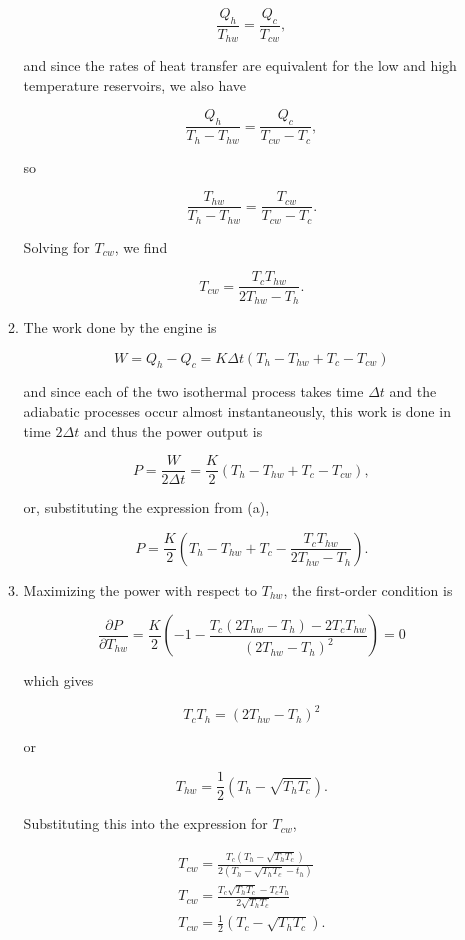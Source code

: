 \documentclass{article}
\begin{document}
\begin{enumerate}
\begin{enumerate}
		$$\frac{Q_h}{T_{hw}} = \frac{Q_c}{T_{cw}},$$

		and since the rates of heat transfer are equivalent for the low and high temperature reservoirs, we also have

		$$\frac{Q_h}{T_h - T_{hw}} = \frac{Q_c}{T_{cw} - T_c},$$

		so

		$$\frac{T_{hw}}{T_h - T_{hw}} = \frac{T_{cw}}{T_{cw} - T_c}.$$

		Solving for $T_{cw}$, we find

		$$T_{cw} = \frac{T_cT_{hw}}{2 T_{hw} - T_h}.$$

		\item

		The work done by the engine is

		$$W = Q_h - Q_c = K \Delta t (T_h - T_{hw} + T_c - T_{cw})$$

		and since each of the two isothermal process takes time $\Delta t$ and the adiabatic processes occur almost instantaneously, this work is done in time $2\Delta t$ and thus the power output is

		$$P = \frac{W}{2\Delta t} = \frac{K}{2} (T_h - T_{hw} + T_c - T_{cw}),$$

		or, substituting the expression from (a), 

		$$P = \frac{K}{2} \left( T_h - T_{hw} + T_c - \frac{T_cT_{hw}}{2 T_{hw} - T_h} \right).$$

		\item

		Maximizing the power with respect to $T_{hw}$, the first-order condition is

		$$
		\frac{\partial P}{\partial T_{hw}} = \frac{K}{2}\left(-1 - \frac{T_c(2T_{hw} - T_h) - 2T_c T_{hw} }{(2 T_{hw} - T_h)^2} \right) = 0
		$$

		which gives

		$$T_c T_h = (2 T_{hw} - T_h)^2$$

		or

		$$T_{hw} = \frac{1}{2} (T_h - \sqrt{T_hT_c}).$$

		Substituting this into the expression for $T_{cw}$, 

		\begin{gather*}
		T_{cw} = \frac{T_c (T_h - \sqrt{T_hT_c})}{2 (T_h - \sqrt{T_hT_c} - t_h)} \\
		T_{cw} = \frac{T_c \sqrt{T_h T_c} - T_c T_h}{2\sqrt{T_hT_c} } \\
		T_{cw} = \frac{1}{2} (T_c - \sqrt{T_h T_c}).
		\end{gather*}


\end{enumerate}
\end{enumerate}
\end{document}
